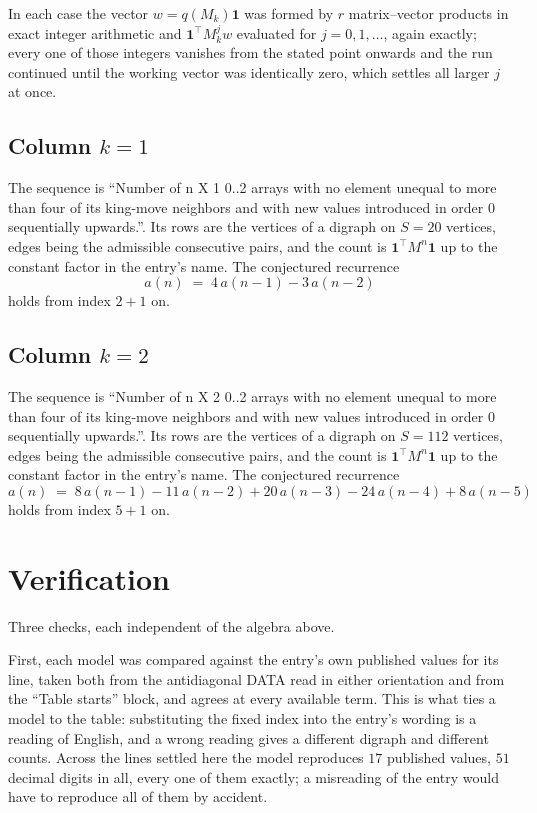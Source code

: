 \documentclass[11pt,a4paper]{article}
\theoremstyle{plain}
\theoremstyle{definition}
\begin{document}
In each case the vector $w=q(M_k)\mathbf{1}$ was formed by $r$ matrix--vector products in
exact integer arithmetic and $\mathbf{1}^{\!\top}M_k^{j}w$ evaluated for $j=0,1,\dots$,
again exactly; every one of those integers vanishes from the stated point onwards and the run
continued until the working vector was identically zero, which settles all larger $j$ at once.

\subsection*{Column $k$$=1$}
The sequence is ``Number of n X 1 0..2 arrays with no element unequal to more than four of its king-move neighbors and with new values introduced in order 0 sequentially upwards.''. Its rows are the vertices of a digraph on
$S=20$ vertices, edges being the admissible consecutive pairs, and the count is
$\mathbf{1}^{\!\top}M^{n}\mathbf{1}$ up to the constant factor in the entry's name.
The conjectured recurrence
\[
a(n)\;=\;4\,a(n-1) - 3\,a(n-2)
\]
holds from index $2+1$ on.

\subsection*{Column $k$$=2$}
The sequence is ``Number of n X 2 0..2 arrays with no element unequal to more than four of its king-move neighbors and with new values introduced in order 0 sequentially upwards.''. Its rows are the vertices of a digraph on
$S=112$ vertices, edges being the admissible consecutive pairs, and the count is
$\mathbf{1}^{\!\top}M^{n}\mathbf{1}$ up to the constant factor in the entry's name.
The conjectured recurrence
\[
a(n)\;=\;8\,a(n-1) - 11\,a(n-2) + 20\,a(n-3) - 24\,a(n-4) + 8\,a(n-5)
\]
holds from index $5+1$ on.

\section{Verification}

Three checks, each independent of the algebra above.

First, each model was compared against the entry's own published values for its line, taken
both from the antidiagonal DATA read in either orientation and from the ``Table starts''
block, and agrees at every available term. This is what ties a model to the table:
substituting the fixed index into the entry's wording is a reading of English, and a wrong
reading gives a different digraph and different counts. Across the lines settled here the
model reproduces $17$ published values, $51$ decimal digits in all, every one of
them exactly; a misreading of the entry would have to reproduce all of them by accident.
\end{document}
